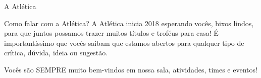 \begin{secao}{A Atlética}
\begin{subsecao}{Como falar com a Atlética?}
A Atlética inicia 2018 esperando vocês, bixos lindos, para que
juntos possamos trazer muitos títulos e troféus para casa! É importantíssimo
que vocês saibam que estamos abertos para qualquer tipo de crítica, dúvida, ideia
ou sugestão.

Vocês são SEMPRE muito bem-vindos em nossa sala, atividades, times e eventos!
\end{subsecao}
\end{secao}
